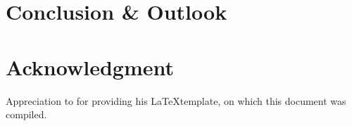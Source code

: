 
\chapter{Conclusion \& Outlook}%











%
%
\chapter{Acknowledgment}%

%

Appreciation to  for providing his \LaTeX template, on which this document was compiled.


